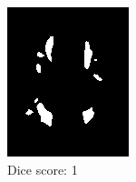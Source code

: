 \documentclass[10pt,twoside]{book}
\begin{document}
\begin{figure}
  \centering
  \begin{subfigure}{0.32\textwidth}
    \centering
    \includegraphics[width=\textwidth]{segmentation1}
    \caption{Dice score: 1}
    \label{fig:Dice_a}
  \end{subfigure}
  \begin{subfigure}{0.32\textwidth}
    \centering

\end{subfigure}
\end{figure}
\end{document}
